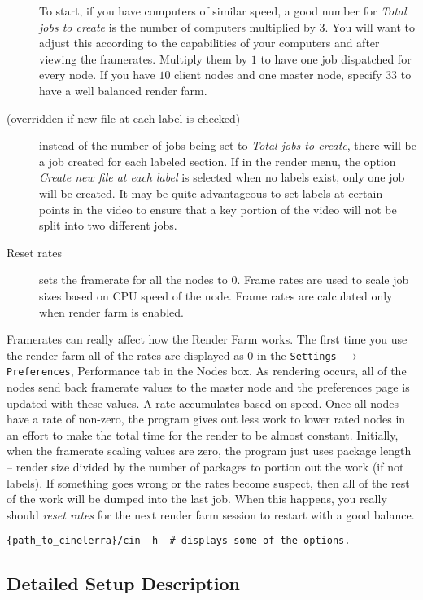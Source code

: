 \begin{description}
  To start, if you have computers of similar speed, a good number
  for \textit{Total jobs to create} is the number of computers
  multiplied by $3$.  You will want to adjust this according to the
  capabilities of your computers and after viewing the framerates.
  Multiply them by $1$ to have one job dispatched for every node.  If
  you have $10$ client nodes and one master node, specify $33$ to have
  a well balanced render farm.
\item[(overridden if new file at each label is checked)] instead of
  the number of jobs being set to \textit{Total jobs to create}, there
  will be a job created for each labeled section.  If in the render
  menu, the option \textit{Create new file at each label} is selected
  when no labels exist, only one job will be created.  It may be quite
  advantageous to set labels at certain points in the video to ensure
  that a key portion of the video will not be split into two different
  jobs.
\item[Reset rates] sets the framerate for all the nodes to $0$.
  Frame rates are used to scale job sizes based on CPU speed of the
  node.  Frame rates are calculated only when render farm is enabled.
\end{description}

Framerates can really affect how the Render Farm works.  The first
time you use the render farm all of the rates are displayed as $0$
in the \texttt{Settings $\rightarrow$ Preferences}, Performance tab
in the Nodes box.  As rendering occurs, all of the nodes send back
framerate values to the master node and the preferences page is
updated with these values.  A rate accumulates based on speed.  Once
all nodes have a rate of non-zero, the program gives out less work
to lower rated nodes in an effort to make the total time for the
render to be almost constant.  Initially, when the framerate scaling
values are zero, the program just uses package length -- render size
divided by the number of packages to portion out the work (if not
labels).  If something goes wrong or the rates become suspect, then
all of the rest of the work will be dumped into the last job.  When
this happens, you really should \textit{reset rates} for the next
render farm session to restart with a good balance.

\begin{lstlisting}[style=sh]
{path_to_cinelerra}/cin -h  # displays some of the options.
\end{lstlisting}

\subsection{Detailed Setup Description}%
\label{sub:detailed_setup_description}

